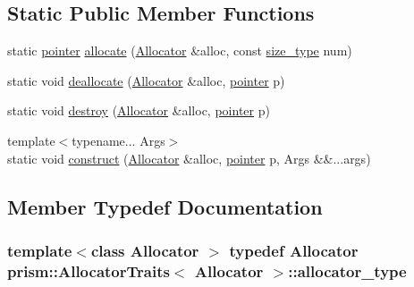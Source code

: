 \subsection*{Static Public Member Functions}
\begin{DoxyCompactItemize}
\item 
static \hyperlink{structprism_1_1_allocator_traits_ae6cca8a97ab96e399c40b5774f425d6f}{pointer} \hyperlink{structprism_1_1_allocator_traits_ad8369f7f86381855bc0cfa4f53acfc0e}{allocate} (\hyperlink{classprism_1_1_allocator}{Allocator} \&alloc, const \hyperlink{structprism_1_1_allocator_traits_a4de8d85d17a31ddc325c2ac079ea1910}{size\+\_\+type} num)
\item 
static void \hyperlink{structprism_1_1_allocator_traits_a19a8de127d4cba707c6612b840e124bb}{deallocate} (\hyperlink{classprism_1_1_allocator}{Allocator} \&alloc, \hyperlink{structprism_1_1_allocator_traits_ae6cca8a97ab96e399c40b5774f425d6f}{pointer} p)
\item 
static void \hyperlink{structprism_1_1_allocator_traits_aa86eefa7ad0ad07e8a8dd8b41135f390}{destroy} (\hyperlink{classprism_1_1_allocator}{Allocator} \&alloc, \hyperlink{structprism_1_1_allocator_traits_ae6cca8a97ab96e399c40b5774f425d6f}{pointer} p)
\item 
{\footnotesize template$<$typename... Args$>$ }\\static void \hyperlink{structprism_1_1_allocator_traits_a1dce5d5dce5ada6c42a31b87a8d5520b}{construct} (\hyperlink{classprism_1_1_allocator}{Allocator} \&alloc, \hyperlink{structprism_1_1_allocator_traits_ae6cca8a97ab96e399c40b5774f425d6f}{pointer} p, Args \&\&...args)
\end{DoxyCompactItemize}


\subsection{Member Typedef Documentation}
\subsubsection[{\texorpdfstring{allocator\+\_\+type}{allocator_type}}]{\setlength{\rightskip}{0pt plus 5cm}template$<$class Allocator $>$ typedef {\bf Allocator} {\bf prism\+::\+Allocator\+Traits}$<$ {\bf Allocator} $>$\+::{\bf allocator\+\_\+type}}\hypertarget{structprism_1_1_allocator_traits_a5c6a9e92c53ee13c947265f07e633324}{}\label{structprism_1_1_allocator_traits_a5c6a9e92c53ee13c947265f07e633324}
